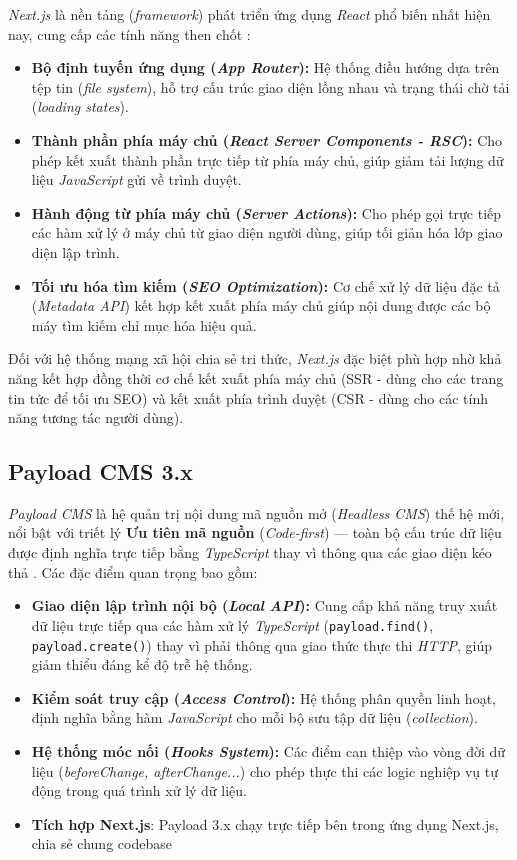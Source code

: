 \documentclass[13pt,a4paper,oneside]{extreport}
\numberwithin{equation}{chapter}
\numberwithin{figure}{chapter}
\numberwithin{table}{chapter}
\begin{document}
\textit{Next.js} là nền tảng (\textit{framework}) phát triển ứng dụng \textit{React} phổ biến nhất hiện nay, cung cấp các tính năng then chốt \cite{ref-next}:

\begin{itemize}
    \item \textbf{Bộ định tuyến ứng dụng (\textit{App Router}):} Hệ thống điều hướng dựa trên tệp tin (\textit{file system}), hỗ trợ cấu trúc giao diện lồng nhau và trạng thái chờ tải (\textit{loading states}).
    \item \textbf{Thành phần phía máy chủ (\textit{React Server Components - RSC}):} Cho phép kết xuất thành phần trực tiếp từ phía máy chủ, giúp giảm tải lượng dữ liệu \textit{JavaScript} gửi về trình duyệt.
    \item \textbf{Hành động từ phía máy chủ (\textit{Server Actions}):} Cho phép gọi trực tiếp các hàm xử lý ở máy chủ từ giao diện người dùng, giúp tối giản hóa lớp giao diện lập trình.
    \item \textbf{Tối ưu hóa tìm kiếm (\textit{SEO Optimization}):} Cơ chế xử lý dữ liệu đặc tả (\textit{Metadata API}) kết hợp kết xuất phía máy chủ giúp nội dung được các bộ máy tìm kiếm chỉ mục hóa hiệu quả.
\end{itemize}

Đối với hệ thống mạng xã hội chia sẻ tri thức, \textit{Next.js} đặc biệt phù hợp nhờ khả năng kết hợp đồng thời cơ chế kết xuất phía máy chủ (SSR - dùng cho các trang tin tức để tối ưu SEO) và kết xuất phía trình duyệt (CSR - dùng cho các tính năng tương tác người dùng).

\subsection{Payload CMS 3.x}

\textit{Payload CMS} là hệ quản trị nội dung mã nguồn mở (\textit{Headless CMS}) thế hệ mới, nổi bật với triết lý \textbf{Ưu tiên mã nguồn} (\textit{Code-first}) — toàn bộ cấu trúc dữ liệu được định nghĩa trực tiếp bằng \textit{TypeScript} thay vì thông qua các giao diện kéo thả \cite{ref-payload}. Các đặc điểm quan trọng bao gồm:

\begin{itemize}
    \item \textbf{Giao diện lập trình nội bộ (\textit{Local API}):} Cung cấp khả năng truy xuất dữ liệu trực tiếp qua các hàm xử lý \textit{TypeScript} (\texttt{payload.find()}, \texttt{payload.create()}) thay vì phải thông qua giao thức thực thi \textit{HTTP}, giúp giảm thiểu đáng kể độ trễ hệ thống.
    \item \textbf{Kiểm soát truy cập (\textit{Access Control}):} Hệ thống phân quyền linh hoạt, định nghĩa bằng hàm \textit{JavaScript} cho mỗi bộ sưu tập dữ liệu (\textit{collection}).
    \item \textbf{Hệ thống móc nối (\textit{Hooks System}):} Các điểm can thiệp vào vòng đời dữ liệu (\textit{beforeChange, afterChange...}) cho phép thực thi các logic nghiệp vụ tự động trong quá trình xử lý dữ liệu.
    \item \textbf{Tích hợp Next.js}: Payload 3.x chạy trực tiếp bên trong ứng dụng Next.js, chia sẻ chung codebase
\end{itemize}
\end{document}
